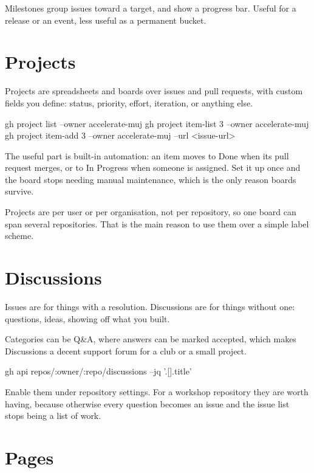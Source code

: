 \documentclass[11pt]{article}
\begin{document}
Milestones group issues toward a target, and show a progress bar. Useful for a
release or an event, less useful as a permanent bucket.

\section{Projects}

Projects are spreadsheets and boards over issues and pull requests, with custom
fields you define: status, priority, effort, iteration, or anything else.

\begin{shell}
gh project list --owner accelerate-muj
gh project item-list 3 --owner accelerate-muj
gh project item-add 3 --owner accelerate-muj --url <issue-url>
\end{shell}

The useful part is built-in automation: an item moves to Done when its pull request
merges, or to In Progress when someone is assigned. Set it up once and the board
stops needing manual maintenance, which is the only reason boards survive.

\begin{note}
Projects are per user or per organisation, not per repository, so one board can span
several repositories. That is the main reason to use them over a simple label
scheme.
\end{note}

\section{Discussions}

Issues are for things with a resolution. Discussions are for things without one:
questions, ideas, showing off what you built.

Categories can be Q\&A, where answers can be marked accepted, which makes
Discussions a decent support forum for a club or a small project.

\begin{shell}
gh api repos/:owner/:repo/discussions --jq '.[].title'
\end{shell}

Enable them under repository settings. For a workshop repository they are worth
having, because otherwise every question becomes an issue and the issue list stops
being a list of work.

\section{Pages}
\end{document}
